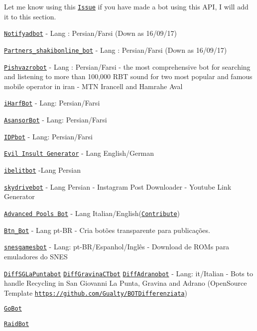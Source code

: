 Let me know using this \href{https://github.com/Eleirbag89/TelegramBotPHP/issues/80}{\tt Issue} if you have made a bot using this A\-P\-I, I will add it to this section.
\begin{DoxyItemize}
\item \href{https://telegram.me/notifyadbot}{\tt Notifyadbot} -\/ Lang \-: Persian/\-Farsi (Down as 16/09/17)
\item \href{https://telegram.me/Partners_shakibonline_bot}{\tt Partners\-\_\-shakibonline\-\_\-bot} -\/ Lang \-: Persian/\-Farsi (Down as 16/09/17)
\item \href{https://t.me/pishvazrobot}{\tt Pishvazrobot} -\/ Lang \-: Persian/\-Farsi -\/ the most comprehensive bot for searching and listening to more than 100,000 R\-B\-T sound for two most popular and famous mobile operator in iran -\/ M\-T\-N Irancell and Hamrahe Aval
\item \href{https://t.me/iHarfBot}{\tt i\-Harf\-Bot} -\/ Lang\-: Persian/\-Farsi
\item \href{https://t.me/AsansorBot}{\tt Asansor\-Bot} -\/ Lang\-: Persian/\-Farsi
\item \href{https://t.me/IDPbot}{\tt I\-D\-Pbot} -\/ Lang\-: Persian/\-Farsi
\item \href{https://telegram.me/EvilInsultGeneratorBot}{\tt Evil Insult Generator} -\/ Lang English/\-German
\item \href{https://telegram.me/ibelitbot}{\tt ibelitbot} -\/\-Lang Persian
\item \href{https://telegram.me/skydrivebot}{\tt skydrivebot} -\/ Lang Persian -\/ Instagram Post Downloader -\/ Youtube Link Generator
\item \href{https://telegram.me/apollbot}{\tt Advanced Pools Bot} -\/ Lang Italian/\-English(\href{https://poeditor.com/join/project/NMAUjrAZ5f}{\tt Contribute})
\item \href{https://telegram.me/Btn_Bot}{\tt Btn\-\_\-\-Bot} -\/ Lang pt-\/\-B\-R -\/ Cria botões transparente para publicações.
\item \href{https://telegram.me/snesgamesbot}{\tt snesgamesbot} -\/ Lang\-: pt-\/\-B\-R/\-Espanhol/\-Inglês -\/ Download de R\-O\-Ms para emuladores do S\-N\-E\-S
\item \href{https://telegram.me/DiffSGLaPuntabot}{\tt Diff\-S\-G\-La\-Puntabot} \href{https://telegram.me/DiffGravinaCTbot}{\tt Diff\-Gravina\-C\-Tbot} \href{https://t.me/DiffAdranobot}{\tt Diff\-Adranobot} -\/ Lang\-: it/\-Italian -\/ Bots to handle Recycling in San Giovanni La Punta, Gravina and Adrano (Open\-Source Template \href{https://github.com/Gualty/BOTDifferenziata}{\tt https\-://github.\-com/\-Gualty/\-B\-O\-T\-Differenziata})
\item \href{https://t.me/CoReYe_PGO_bot}{\tt Go\-Bot}
\item \href{https://t.me/CoReYe_PGO_Raid_bot}{\tt Raid\-Bot}
\end{DoxyItemize}

